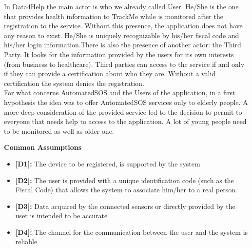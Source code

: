 

In Data4Help the main actor is who we already called User. He/She is the one that provides health information to TrackMe while is monitored after the registration to the service. Without this presence, the application does not have any reason to exist. He/She is uniquely recognizable by his/her fiscal code and his/her login information.There is also the presence of another actor: the Third Party. It looks for the information provided by the users for its own interests (from business to healthcare). Third parties can access to the service if and only if they can provide a certification about who they are. Without a valid certification the system denies the registration.\\
For what concerns AutomatedSOS and the Users of the application, in a first hypothesis the idea was to offer AutomatedSOS services only to elderly people. A more deep consideration of the provided service led to the decision to permit to everyone that needs help to access to the application. A lot of young people need to be monitored as well as older one.
\newpage

{}
{}
\raggedright
\textbf{Common Assumptions}
\begin{itemize}
	\item\textbf{[D1]:} The device to be registered, is supported by the system
	\item\textbf{[D2]:} The user is provided with a unique identification code (such as the Fiscal Code) that allows the system to associate him/her to a real person.
	\item\textbf{[D3]:} Data acquired by the connected sensors or directly provided by the user is intended to be accurate
	\item\textbf{[D4]:} The channel for the communication between the user and the system is reliable
\end{itemize}

